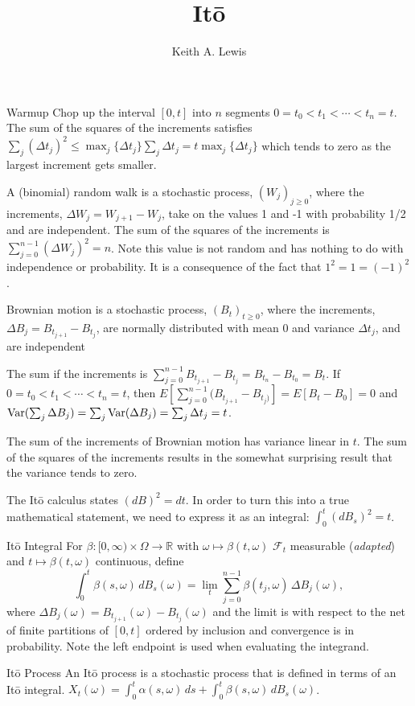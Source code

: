 \documentclass[fleqn]{amsart}
\title{It\=o}
\author{Keith A. Lewis}
\def\F{\mathcal{F}}
\def\Var{\mathop{\rm Var}}
\newcommand{\RR}{\mathbb{R}}
\begin{document}
\maketitle

\begin{section}{Warmup}
Chop up the interval $[0, t]$ into $n$ segments $0 = t_0 < t_1 <
\cdots < t_n = t$.  The sum of the squares of the increments satisfies
$\sum_j (\Delta t_j)^2 \le \max_j\{\Delta t_j\} \sum_j \Delta t_j =
t \max_j\{\Delta t_j\}$ which tends to zero as the largest increment
gets smaller.

A (binomial) random walk is a stochastic process, $(W_j)_{j\ge0}$,
where the increments, $\Delta W_j = W_{j+1} - W_j$, take on the values
1 and -1 with probability 1/2 and are independent.  The sum of the
squares of the increments is $\sum_{j=0}^{n-1} (\Delta W_j)^2 = n$.
Note this value is not random and has nothing to do with independence
or probability. It is a consequence of the fact that $1^2 = 1 = (-1)^2$.

Brownian motion is a stochastic process, $(B_t)_{t\ge0}$, where the
increments, $\Delta B_j = B_{t_{j+1}} - B_{t_j}$, are normally distributed
with mean $0$ and variance $\Delta t_j$, and are independent

The sum if the increments is $\sum_{j=0}^{n-1} B_{t_{j+1}}
- B_{t_j} = B_{t_n} - B_{t_0} = B_t$. 
If $0 = t_0 < t_1 < \cdots < t_n = t$, then $E[\sum_{j=0}^{n-1}
(B_{t_{j+1}} - B_{t_j)}] = E[B_t - B_0] = 0$ and $\Var(\sum_j \Delta B_j)
= \sum_j \Var(\Delta B_j) = \sum_j \Delta t_j = t$.

The sum of the increments of Brownian motion has variance linear in $t$.
The sum of the squares of the increments results in the somewhat
surprising result that the variance tends to zero.

The It\=o calculus states
$(dB)^2 = dt$. In order to turn this into a true mathematical statement,
we need to express it as an integral: $\int_0^t (dB_s)^2 = t$.

\end{section}

\begin{section}{It\=o Integral}
For $\beta\colon [0,\infty)\times
\Omega\to\RR$ with $\omega\mapsto\beta(t,\omega)$ $\F_t$
measurable ({\em adapted}) and $t\mapsto\beta(t, \omega)$ continuous, define
\begin{equation*}
\int_0^t \beta(s,\omega)\,dB_s(\omega)
    = \lim_{t} \sum_{j = 0}^{n - 1} \beta(t_j, \omega)\,\Delta B_j(\omega),
\end{equation*}
where $\Delta B_j(\omega) = B_{t_{j+1}}(\omega) - B_{t_j}(\omega)$ and
the limit is with respect to the net of finite partitions of $[0,t]$
ordered by inclusion and convergence is in probability. Note the left
endpoint is used when evaluating the integrand. 
\end{section}

\begin{section}{It\=o Process}
An It\=o process is a stochastic process that is defined in terms
of an It\=o integral. $X_t(\omega) = \int_0^t \alpha(s, \omega)\,ds
+ \int_0^t \beta(s, \omega)\,dB_s(\omega)$.

\end{section}
\end{document}
